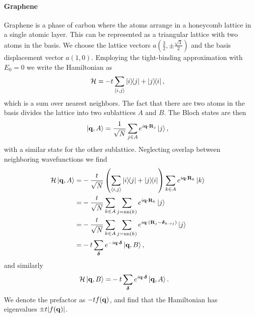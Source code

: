 \paragraph{Graphene}
Graphene is a phase of carbon where the atoms arrange in a honeycomb lattice in a single atomic layer. This can be represented as a triangular lattice with two atoms in the basis. We choose the lattice vectors $a\left(\frac{3}{2}, \pm\frac{\sqrt{3}}{2}\right)$ and the basis displacement vector $a(1, 0)$. Employing the tight-binding approximation with $E_{0} = 0$ we write the Hamiltonian as
\begin{align*}
	\mathcal{H} = -t\sum\limits_{\expval{i, j}}\op{i}{j} + \op{j}{i},
\end{align*}
which is a sum over nearest neighbors. The fact that there are two atoms in the basis divides the lattice into two sublattices $A$ and $B$. The Bloch states are then
\begin{align*}
	\ket{\vb{q}, A} = \frac{1}{\sqrt{N}}\sum\limits_{j\in A}e^{i\vb{q}\cdot\vb{R}_{j}}\ket{j},
\end{align*}
with a similar state for the other sublattice. Neglecting overlap between neighboring wavefunctions we find
\begin{align*}
	\mathcal{H}\ket{\vb{q}, A} =& -\frac{t}{\sqrt{N}}\left(\sum\limits_{\expval{i, j}}\op{i}{j} + \op{j}{i}\right)\sum\limits_{k\in A}e^{i\vb{q}\cdot\vb{R}_{k}}\ket{k} \\
	                    =& -\frac{t}{\sqrt{N}}\sum\limits_{k\in A}\sum\limits_{j = \text{nn}(k)}e^{i\vb{q}\cdot\vb{R}_{k}}\ket{j} \\
	                    =& -\frac{t}{\sqrt{N}}\sum\limits_{k\in A}\sum\limits_{j = \text{nn}(k)}e^{i\vb{q}\cdot(\vb{R}_{j} - \vb*{\delta}_{k\to j})}\ket{j} \\ 
	                    =& -t\sum\limits_{\vb*{\delta}}e^{-i\vb{q}\cdot\vb*{\delta}}\ket{\vb{q}, B},
\end{align*}
and similarly
\begin{align*}
	\mathcal{H}\ket{\vb{q}, B} =& -t\sum\limits_{\vb*{\delta}}e^{i\vb{q}\cdot\vb*{\delta}}\ket{\vb{q}, A}.
\end{align*}
We denote the prefactor as $-tf(\vb{q})$, and find that the Hamiltonian has eigenvalues $\pm t\abs{f(\vb{q})}$.

